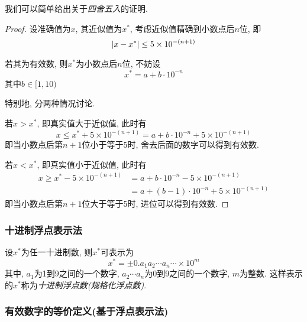 \begin{extend}
    我们可以简单给出关于\emph{四舍五入}的证明.

    \begin{proof}
        设准确值为$x$, 其近似值为$x^*$, 考虑近似值精确到小数点后$n$位, 即
        \begin{equation*}
            \abs{x-x^*}\le5\times10^{-(n+1)}
        \end{equation*}

        若其为有效数, 则$x^*$为小数点后$n$位, 不妨设
        \begin{equation*}
            x^*=a+b\cdot10^{-n}
        \end{equation*}
        其中$b\in[1,10)$

        特别地, 分两种情况讨论. 

        若$x>x^*$, 即真实值大于近似值, 此时有
        \begin{equation*}
            x\le x^*+5\times10^{-(n+1)}=a+b\cdot10^{-n}+5\times10^{-(n+1)}
        \end{equation*}
        即当小数点后第$n+1$位小于等于5时, 舍去后面的数字可以得到有效数.

        若$x<x^*$, 即真实值小于近似值, 此时有
        \begin{align*}
            x\ge x^*-5\times10^{-(n+1)}&=a+b\cdot10^{-n}-5\times10^{-(n+1)}\\
            &=a+(b-1)\cdot10^{-n}+5\times10^{-(n+1)}
        \end{align*}
        即当小数点后第$n+1$位大于等于5时, 进位可以得到有效数.
    \end{proof}
\end{extend}

\subsubsection{十进制浮点表示法}

\begin{definition}
    设$x^*$为任一十进制数, 则$x^*$可表示为
    \begin{equation*}\label{eqn:1.3.1}
        x^*=\pm0.a_1a_2\cdots a_n\cdots\times10^m
    \end{equation*}
    其中, $a_1$为1到9之间的一个数字, $a_2\cdots a_n$为0到9之间的一个数字, $m$为整数. 这样表示的$x^*$称为\emph{十进制浮点数(规格化浮点数)}.
\end{definition}

\subsubsection{有效数字的等价定义(基于浮点表示法)}

